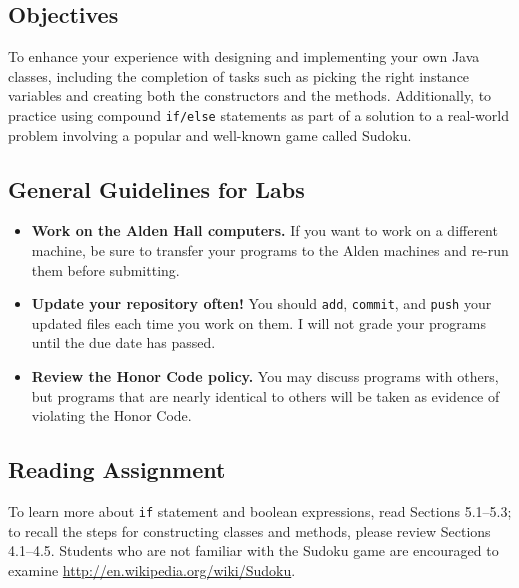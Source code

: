 



\vspace{-0.2in}
\subsection*{Objectives}
\vspace{-0.05in}

To enhance your experience with designing and implementing your own Java classes, including the completion of tasks such
as picking the right instance variables and creating both the constructors and the methods.  Additionally, to practice
using compound {\tt if/else} statements as part of a solution to a real-world problem involving a popular and well-known
game called Sudoku.

\vspace{-0.15in}
\subsection*{General Guidelines for Labs}
\vspace{-0.05in}
\begin{itemize}
\item
{\bf Work on the Alden Hall computers.} If you want to work on a different
machine, be sure to transfer your programs to the Alden
machines and re-run them before submitting.
\item
  {\bf Update your repository often!} You should {\tt add}, {\tt commit},
  and {\tt push} your updated files each time you work on them.  I will not grade
your programs until the due date has passed.
\item
{\bf Review the Honor Code policy.} You
may discuss programs with others, but programs that are nearly identical
to others will be taken as evidence of violating the Honor Code.
\end{itemize}

\vspace{-0.3in}
\subsection*{Reading Assignment}
\vspace{-0.05in}

To learn more about {\tt if} statement and boolean expressions, read Sections 5.1--5.3; to recall the steps for
constructing classes and methods, please review Sections 4.1--4.5. Students who are not familiar with the Sudoku game
are encouraged to examine \url{http://en.wikipedia.org/wiki/Sudoku}.

